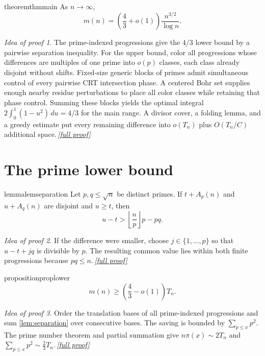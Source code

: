 \documentclass[11pt,a4paper]{article}
\theoremstyle{plain}
\theoremstyle{definition}
\theoremstyle{remark}
\newtheorem*{proofidea}{Idea of proof}
\newcommand{\fullproofref}[1]{\,\hyperref[#1]{\textit{[full proof]}}}
\begin{document}
\begin{restatable}{theorem}{thmmain}\label{thm:main}
As $n\to\infty$,
\[
 m(n)=\left(\frac43+o(1)\right)\frac{n^{3/2}}{\log n}.
\]
\end{restatable}
\begin{proofidea}
The prime-indexed progressions give the $4/3$ lower bound by a pairwise separation inequality. For the upper bound, color all progressions whose differences are multiples of one prime into $o(p)$ classes, each class already disjoint without shifts. Fixed-size generic blocks of primes admit simultaneous control of every pairwise CRT intersection phase. A centered Bohr set supplies enough nearby residue perturbations to place all color classes while retaining that phase control. Summing these blocks yields the optimal integral $2\int_0^1(1-u^2)\,du=4/3$ for the main range. A divisor cover, a folding lemma, and a greedy estimate put every remaining difference into $o(T_n)$ plus $O(T_n/C)$ additional space.\fullproofref{pf:main}
\end{proofidea}

\section{The prime lower bound}\label{sec:lower}

\begin{restatable}{lemma}{lemseparation}\label{lem:separation}
Let $p,q\le\sqrt n$ be distinct primes. If $t+A_p(n)$ and $u+A_q(n)$ are disjoint and $u\ge t$, then
\[
 u-t>\left\lfloor\frac np\right\rfloor p-pq.
\tag{2.1}
\]
\end{restatable}
\begin{proofidea}
If the difference were smaller, choose $j\in\{1,\ldots,p\}$ so that $u-t+jq$ is divisible by $p$. The resulting common value lies within both finite progressions because $pq\le n$.\fullproofref{pf:separation}
\end{proofidea}

\begin{restatable}{proposition}{proplower}\label{prop:lower}
\[
 m(n)\ge\left(\frac43-o(1)\right)T_n.
\tag{2.2}\label{eq:prime-lower}
\]
\end{restatable}
\begin{proofidea}
Order the translation bases of all prime-indexed progressions and sum \cref{lem:separation} over consecutive bases. The saving is bounded by $\sum_{p\le x}p^2$. The prime number theorem and partial summation give $n\pi(x)\sim2T_n$ and $\sum_{p\le x}p^2\sim\frac23T_n$.\fullproofref{pf:lower}
\end{proofidea}
\end{document}

